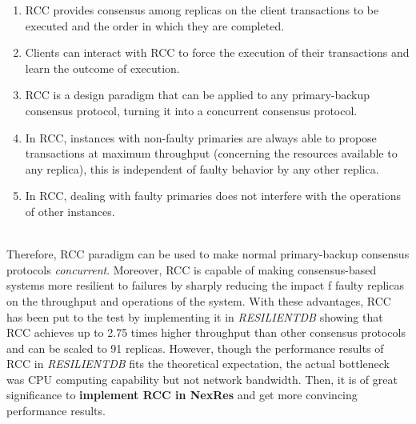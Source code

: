 \begin{enumerate}
    \item RCC provides consensus among replicas on the client transactions to be executed and the order in which they are completed.
    \item  Clients can interact with RCC to force the execution of their transactions and learn the outcome of execution.
    \item  RCC is a design paradigm that can be applied to any primary-backup consensus protocol, turning it into a concurrent consensus protocol.
    \item  In RCC, instances with non-faulty primaries are always able to propose transactions at maximum throughput (concerning the resources available to any replica), this is independent of faulty behavior by any other replica.
    \item  In RCC, dealing with faulty primaries does not interfere with the operations of other instances.
\end{enumerate} \\
Therefore, RCC paradigm can be used to make normal primary-backup consensus protocols \textit{concurrent}. Moreover, RCC is capable of making consensus-based systems more resilient to failures by sharply reducing the impact f faulty replicas on the throughput and operations of the system. With these advantages, RCC has been put to the test by implementing it in \textit{RESILIENTDB} showing that RCC achieves up to 2.75 times higher throughput than other consensus protocols and can be scaled to 91 replicas. However, though the performance results of RCC in \textit{RESILIENTDB} fits the theoretical expectation, the actual bottleneck was CPU computing capability but not network bandwidth. Then, it is of great significance to \textbf{implement RCC in NexRes} and get more convincing performance results.
